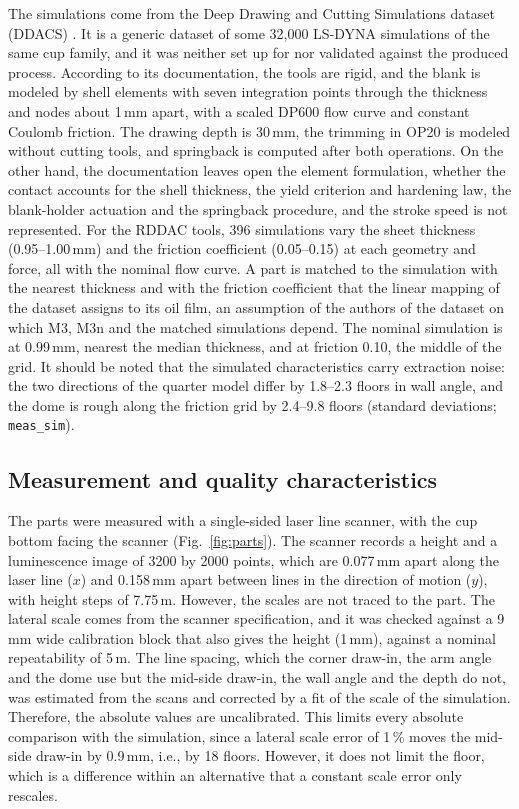 \documentclass[pdflatex,sn-basic,lineno]{sn-jnl}
\newcommand{\res}[1]{\texttt{#1}}  %
\begin{document}
The simulations come from the Deep Drawing and Cutting Simulations dataset (DDACS) \citep{baum2025ddacs, heinzelmann2025comprehensive}. It is a generic dataset of some 32,000 LS-DYNA simulations of the same cup family, and it was neither set up for nor validated against the produced process. According to its documentation, the tools are rigid, and the blank is modeled by shell elements with seven integration points through the thickness and nodes about 1\,mm apart, with a scaled DP600 flow curve and constant Coulomb friction. The drawing depth is 30\,mm, the trimming in OP20 is modeled without cutting tools, and springback is computed after both operations. On the other hand, the documentation leaves open the element formulation, whether the contact accounts for the shell thickness, the yield criterion and hardening law, the blank-holder actuation and the springback procedure, and the stroke speed is not represented. For the RDDAC tools, 396 simulations vary the sheet thickness (0.95--1.00\,mm) and the friction coefficient (0.05--0.15) at each geometry and force, all with the nominal flow curve. A part is matched to the simulation with the nearest thickness and with the friction coefficient that the linear mapping of the dataset assigns to its oil film, an assumption of the authors of the dataset on which M3, M3n and the matched simulations depend. The nominal simulation is at 0.99\,mm, nearest the median thickness, and at friction 0.10, the middle of the grid. It should be noted that the simulated characteristics carry extraction noise: the two directions of the quarter model differ by 1.8--2.3 floors in wall angle, and the dome is rough along the friction grid by 2.4--9.8 floors (standard deviations; \res{meas\_sim}).

\subsection{Measurement and quality characteristics}\label{sec:qcs}

The parts were measured with a single-sided laser line scanner, with the cup bottom facing the scanner (Fig.~\ref{fig:parts}). The scanner records a height and a luminescence image of 3200 by 2000 points, which are 0.077\,mm apart along the laser line ($x$) and 0.158\,mm apart between lines in the direction of motion ($y$), with height steps of 7.75\,\textmu m. However, the scales are not traced to the part. The lateral scale comes from the scanner specification, and it was checked against a 9\,mm wide calibration block that also gives the height (1\,mm), against a nominal repeatability of 5\,\textmu m. The line spacing, which the corner draw-in, the arm angle and the dome use but the mid-side draw-in, the wall angle and the depth do not, was estimated from the scans and corrected by a fit of the scale of the simulation. Therefore, the absolute values are uncalibrated. This limits every absolute comparison with the simulation, since a lateral scale error of 1\,\% moves the mid-side draw-in by 0.9\,mm, i.e., by 18 floors. However, it does not limit the floor, which is a difference within an alternative that a constant scale error only rescales.
\end{document}

